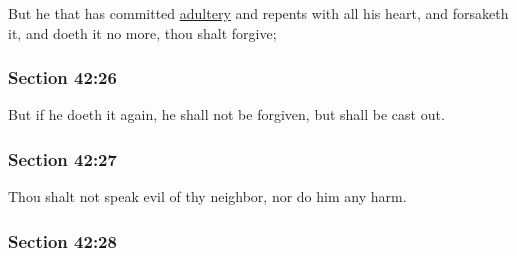 		But he that has committed \hyperref[ADULTERY]{adultery} and repents with all his heart, and forsaketh it, and doeth it no more, thou shalt forgive;


	\subsubsection{Section 42:26} %
		\label{DC42-26}

		But if he doeth it again, he shall not be forgiven, but shall be cast out.


	\subsubsection{Section 42:27} %
		\label{DC42-27}

		Thou shalt not speak evil of thy neighbor, nor do him any harm.


	\subsubsection{Section 42:28} %
		\label{DC42-28}

